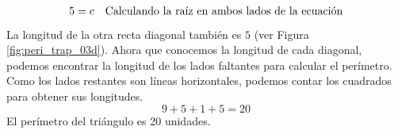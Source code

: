 \begin{solutionbox}{9.5cm}
\begin{minipage}{0.55\textwidth}
\begin{align*}
            5=c           & \text{\quad Calculando la raíz en ambos lados de la ecuación} \\
        \end{align*}
        La longitud de la otra recta diagonal también es $5$ (ver Figura \ref{fig:peri_trap_03d}).
        Ahora que conocemos la longitud de cada diagonal, podemos encontrar la longitud de los lados faltantes para calcular el perímetro.
        Como los lados restantes son líneas horizontales, podemos contar los cuadrados para obtener sus longitudes.
        \[9+5+1+5=20\]
        El perímetro del triángulo es 20 unidades.
    \end{minipage}
\end{solutionbox}

